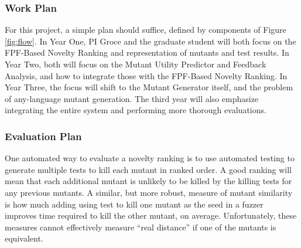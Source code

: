 \subsubsection{Work Plan}

For this project, a simple plan should suffice, defined by components
of Figure \ref{fig:flow}.  In Year One, PI Groce and the graduate
student will both focus on the FPF-Based Novelty Ranking and
representation of mutants and test results.  In Year
Two, both will focus on the Mutant Utility Predictor and Feedback
Analysis, and how to integrate those with the FPF-Based Novelty
Ranking.  In Year Three, the focus will shift to the Mutant Generator
itself, and the problem of any-language mutant generation.  The third
year will also emphasize integrating the entire system and performing
more thorough evaluations.

\subsubsection{Evaluation Plan}

One automated way to evaluate a novelty ranking is to use automated
testing to generate multiple tests to kill each mutant in ranked order.  A good ranking will mean
that each additional mutant is unlikely to be killed by the killing
tests for any previous mutants.  A similar, but more robust, measure of mutant similarity
is how much adding using test to kill one mutant as the seed in a
fuzzer~\cite{aflfuzz,libfuzzer} improves time required to kill the other
mutant, on average.  Unfortunately, these measures cannot effectively
measure ``real distance'' if one of the mutants is equivalent.